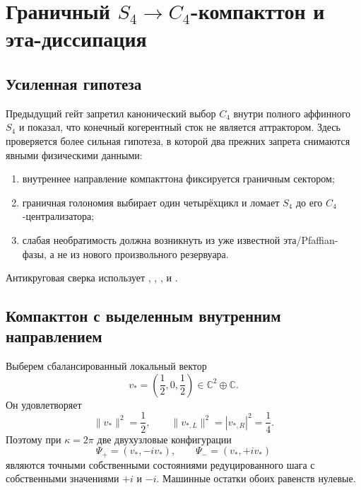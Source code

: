 \chapter{Граничный \texorpdfstring{$S_4\to C_4$}{S4 to C4}-компакттон и эта-диссипация}
\label{ch:v6-spectral-transition-discrete-compacton-c4-boundary-eta-dissipation-gate}

\section{Усиленная гипотеза}

Предыдущий гейт запретил канонический выбор $C_4$ внутри полного
аффинного $S_4$ и показал, что конечный когерентный сток не является
аттрактором. Здесь проверяется более сильная гипотеза, в которой два
прежних запрета снимаются явными физическими данными:
\begin{enumerate}
 \item внутреннее направление компакттона фиксируется граничным сектором;
 \item граничная голономия выбирает один четырёхцикл и ломает
 $S_4$ до его $C_4$-централизатора;
 \item слабая необратимость должна возникнуть из уже известной
 эта/Pfaffian-фазы, а не из нового произвольного резервуара.
\end{enumerate}

Антикруговая сверка использует
,
,
,
 и
.

\section{Компакттон с выделенным внутренним направлением}

Выберем сбалансированный локальный вектор
\begin{equation}
 v_*=\left(\frac12,0,\frac12\right)\in\mathbb C^2\oplus\mathbb C.
 \label{eq:v6-c4-eta-selected-axis}
\end{equation}
Он удовлетворяет
\begin{equation}
 \|v_*\|^2=\frac12,
 \qquad
 \|v_{*,L}\|^2=|v_{*,R}|^2=\frac14.
\end{equation}
Поэтому при $\kappa=2\pi$ две двухузловые конфигурации
\begin{equation}
 \Psi_+=(v_*,-iv_*),
 \qquad
 \Psi_-=(v_*,+iv_*)
 \label{eq:v6-c4-eta-selected-compactons}
\end{equation}
являются точными собственными состояниями редуцированного шага с
собственными значениями $+i$ и $-i$. Машинные остатки обоих равенств
нулевые.

